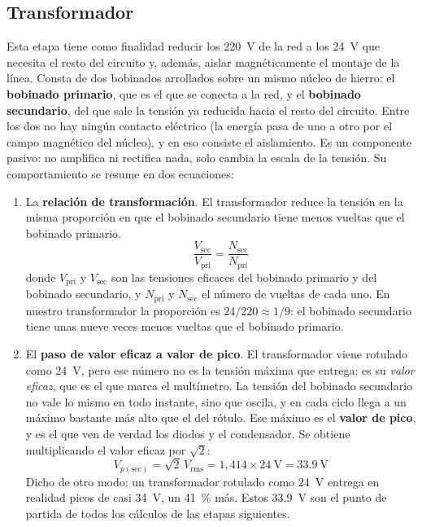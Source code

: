 \documentclass[11pt,a4paper]{article}
\begin{document}
\subsection{Transformador}
Esta etapa tiene como finalidad reducir los \qty{220}{\volt} de la red a los
\qty{24}{\volt} que necesita el resto del circuito y, además, aislar magnéticamente el
montaje de la línea. Consta de dos bobinados arrollados sobre un mismo núcleo de hierro:
el \textbf{bobinado primario}, que es el que se conecta a la red, y el
\textbf{bobinado secundario}, del que sale la tensión ya reducida hacia el resto del
circuito. Entre los dos no hay ningún
contacto eléctrico (la energía pasa de uno a otro por el campo magnético del núcleo), y en
eso consiste el aislamiento. Es un componente pasivo: no amplifica ni rectifica nada, solo
cambia la escala de la tensión. Su comportamiento se resume en dos ecuaciones:

\begin{enumerate}[label=\textbf{\alph*)}, leftmargin=*, labelsep=0.6em]
\item La \textbf{relación de transformación}. El transformador reduce la tensión en la
misma proporción en que el bobinado secundario tiene menos vueltas que el bobinado
primario.
\begin{equation}
  \frac{V_{\text{sec}}}{V_{\text{pri}}}=\frac{N_{\text{sec}}}{N_{\text{pri}}}
  \label{eq:transformacion}
\end{equation}
donde $V_{\text{pri}}$ y $V_{\text{sec}}$ son las tensiones eficaces del bobinado primario y
del bobinado secundario, y $N_{\text{pri}}$ y $N_{\text{sec}}$ el número de vueltas de cada
uno. En nuestro transformador la proporción es $24/220\approx 1/9$: el bobinado secundario
tiene unas nueve veces menos vueltas que el bobinado primario.

\item El \textbf{paso de valor eficaz a valor de pico}. El transformador viene rotulado
como \qty{24}{\volt}, pero ese número no es la tensión máxima que entrega: es su
\emph{valor eficaz}, que es el que marca el multímetro. La tensión del bobinado secundario
no vale lo mismo en todo instante, sino que oscila, y en cada ciclo llega a un máximo
bastante más alto que el del rótulo. Ese máximo es el \textbf{valor de pico}, y es el que
ven de verdad los diodos y el condensador. Se obtiene multiplicando el valor eficaz
por $\sqrt{2}$:
\begin{equation}
  V_{p(\text{sec})}=\sqrt{2}\,V_{\text{rms}}=1{,}414\times\qty{24}{\volt}=\qty{33.9}{\volt}
  \label{eq:pico-sec}
\end{equation}
Dicho de otro modo: un transformador rotulado como \qty{24}{\volt} entrega en realidad
picos de casi \qty{34}{\volt}, un \qty{41}{\percent} más. Estos \qty{33.9}{\volt} son el
punto de partida de todos los cálculos de las etapas siguientes.
\end{enumerate}
\end{document}
